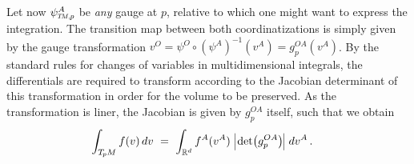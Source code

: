 Let now $\psiTMp^A$ be \emph{any} gauge at $p$, relative to which one might want to express the integration.
The transition map between both coordinatizations is simply given by the gauge transformation
$v^O = \psi^O \circ (\psi^A )^{-1} (v^A) = g^{OA}_p (v^A)$.
By the standard rules for changes of variables in multidimensional integrals, the differentials are required to transform according to the Jacobian determinant of this transformation in order for the volume to be preserved.
As the transformation is liner, the Jacobian is given by $g_p^{OA}$ itself, such that we obtain
\begin{align}\label{eq:integral_gOA}
    \int_{\TpM} f(v)\, dv
    \ &=\ \int_{\R^d} f^A(v^A)\; \pig|\mkern-2mu \det \!\big(g_p^{OA} \big)\mkern-1mu\pig|\; dv^A \,.
\end{align}


